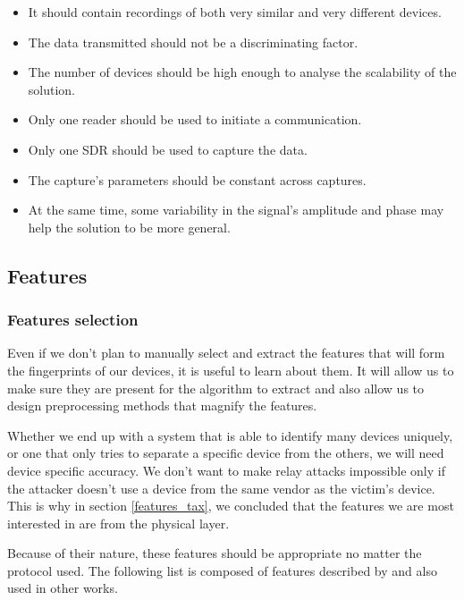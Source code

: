 \begin{itemize}
  \item It should contain recordings of both very similar and very different devices.
  \item The data transmitted should not be a discriminating factor.
  \item The number of devices should be high enough to analyse the scalability of the solution.
  \item Only one reader should be used to initiate a communication.
  \item Only one SDR should be used to capture the data.
  \item The capture's parameters should be constant across captures.
  \item At the same time, some variability in the signal's amplitude and phase may help the solution to be more general.
\end{itemize}

\subsection{Features}

\subsubsection{Features selection}

Even if we don't plan to manually select and extract the features that will form the fingerprints of our devices, it is useful to learn about them. It will allow us to make sure they are present for the algorithm to extract and also allow us to design preprocessing methods that magnify the features.

Whether we end up with a system that is able to identify many devices uniquely, or one that only tries to separate a specific device from the others, we will need device specific accuracy. We don't want to make relay attacks impossible only if the attacker doesn't use a device from the same vendor as the victim's device. This is why in section \ref{features_tax}, we concluded that the features we are most interested in are from the physical layer.

Because of their nature, these features should be appropriate no matter the protocol used. The following list is composed of features described by \textcite{riyaz_deep_2018} and also used in other works.

